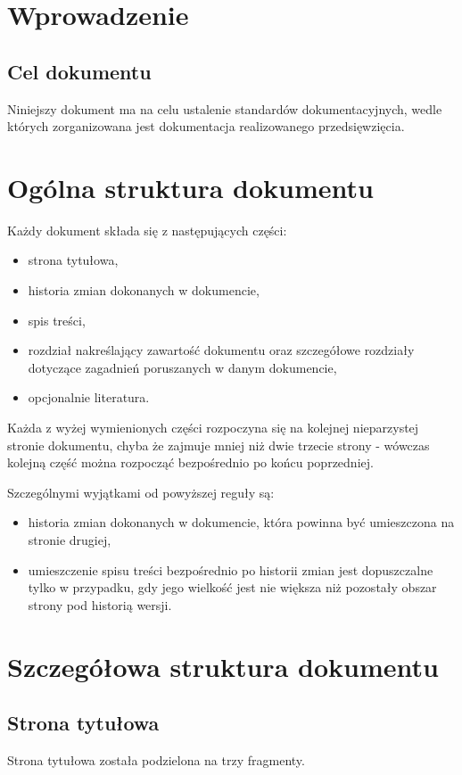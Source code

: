 \documentclass 	[11pt, a4paper, leqno]	{article}					%
\begin{document}
\section{Wprowadzenie}

\subsection{Cel dokumentu}
\noindent
Niniejszy dokument ma na celu ustalenie standardów dokumentacyjnych, wedle których zorganizowana jest dokumentacja realizowanego przedsięwzięcia.
\section{Ogólna struktura dokumentu}
\noindent
Każdy dokument składa się z następujących części:
\begin{itemize}
	\item strona tytułowa,
	\item historia zmian dokonanych w dokumencie,
	\item spis treści,
	\item rozdział nakreślający zawartość dokumentu oraz szczegółowe rozdziały dotyczące zagadnień poruszanych w danym dokumencie,
	\item opcjonalnie literatura.
\end{itemize}

Każda z wyżej wymienionych części rozpoczyna się na kolejnej nieparzystej stronie dokumentu, chyba że zajmuje mniej niż dwie trzecie strony - wówczas kolejną część można rozpocząć bezpośrednio po końcu poprzedniej. 

Szczególnymi wyjątkami od powyższej reguły są:

\begin{itemize}
	\item historia zmian dokonanych w dokumencie, która powinna być umieszczona na stronie drugiej,
	\item umieszczenie spisu treści bezpośrednio po historii zmian jest dopuszczalne tylko w przypadku, gdy jego wielkość jest nie większa niż pozostały obszar strony pod historią wersji.
\end{itemize}

\section{Szczegółowa struktura dokumentu}
\subsection{Strona tytułowa}
\noindent
Strona tytułowa została podzielona na trzy fragmenty.
\end{document}
